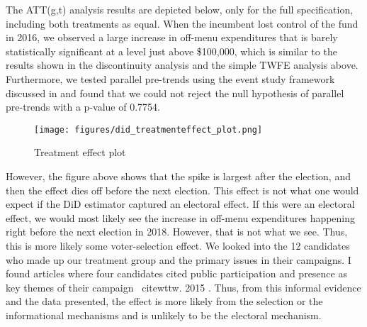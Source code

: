 The ATT(g,t) analysis results are depicted below, only for the full specification, including both treatments as equal. 
When the incumbent lost control of the fund in 2016, we observed a large increase in off-menu expenditures that is barely statistically significant at a level just above \$100,000, which is similar to the results shown in the discontinuity analysis and the simple TWFE analysis above. 
Furthermore, we tested parallel pre-trends using the event study framework discussed in \cite{CALLAWAY2021200} and found that we could not reject the null hypothesis of parallel pre-trends with a p-value of 0.7754. 

\begin{figure}[H]
    \centering
    \texttt{[image: figures/did\_treatmenteffect\_plot.png]}
    \caption{Treatment effect plot}
\end{figure}


However, the figure above shows that the spike is largest after the election, and then the effect dies off before the next election. This effect is not what one would expect if the DiD estimator captured an electoral effect. 
If this were an electoral effect, we would most likely see the increase in off-menu expenditures happening right before the next election in 2018. However, that is not what we see. 
Thus, this is more likely some voter-selection effect. 
We looked into the 12 candidates who made up our treatment group and the primary issues in their campaigns. 
I found articles where four candidates cited public participation and presence as key themes of their campaign \, cite{wttw. 2015} \cite{dna.2015_18} \cite{dna.2015_35} \cite{dna.2015_7}. 
Thus, from this informal evidence and the data presented, the effect is more likely from the selection or the informational mechanisms and is unlikely to be the electoral mechanism. 